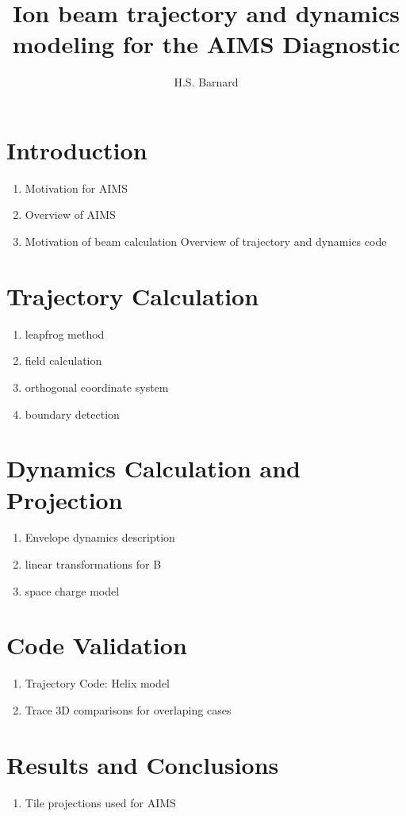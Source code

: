 \documentclass[12pt,letterpaper]{article}
\author{H.S. Barnard}
\title{Ion beam trajectory and dynamics modeling for the AIMS Diagnostic}
\begin{document}
\maketitle
\section{Introduction}
\begin{enumerate}
\item Motivation for AIMS
\item Overview of AIMS
\item Motivation of beam calculation
\itme Overview of trajectory and dynamics code
\end{enumerate}

\section{Trajectory Calculation}
\begin{enumerate}
\item leapfrog method
\item field calculation
\item orthogonal coordinate system
\item boundary detection
\end{enumerate}

\section{Dynamics Calculation and Projection}
\begin{enumerate}
\item Envelope dynamics description
\item linear transformations for B
\item space charge model
\end{enumerate}

\section{Code Validation}
\begin{enumerate}
\item Trajectory Code: Helix model
\item Trace 3D comparisons for overlaping cases
\end{enumerate}

\section{Results and Conclusions}

\begin{enumerate}
\item Tile projections used for AIMS
\end{enumerate}
\end{document}
